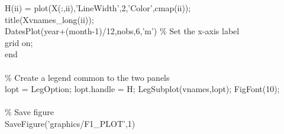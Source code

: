 \hspace{1mm}\hspace{5mm} \hspace{5mm} H(ii) = plot(X(:,ii),\textcolor{matlabpurple}{'LineWidth'},2,\textcolor{matlabpurple}{'Color'},cmap(ii)); \\ 
\hspace{1mm}\hspace{5mm} \hspace{5mm} title(Xvnames\_long(ii));  \\ 
\hspace{1mm}\hspace{5mm} \hspace{5mm} DatesPlot(year+(month-1)/12,nobs,6,\textcolor{matlabpurple}{'m'}) \textcolor{matlabgreen}{\% Set the x-axis label  }\\ 
\hspace{1mm}\hspace{5mm} \hspace{5mm} grid on;  \\ 
\hspace{1mm}\hspace{5mm} \textcolor{matlabblue}{end} \\ 
\hspace{1mm}\hspace{5mm}  \\ 
\hspace{1mm}\hspace{5mm} \textcolor{matlabgreen}{\% Create a legend common to the two panels }\\ 
\hspace{1mm}\hspace{5mm} lopt = LegOption; lopt.handle = H; LegSubplot(vnames,lopt); FigFont(10); \\ 
\hspace{1mm}\hspace{5mm}  \\ 
\hspace{1mm}\hspace{5mm} \textcolor{matlabgreen}{\% Save figure }\\ 
\hspace{1mm}\hspace{5mm} SaveFigure(\textcolor{matlabpurple}{'graphics/F1\_PLOT'},1) \\ 
\hspace{1mm}\hspace{5mm}  \\ 
\hspace{1mm}\hspace{5mm}  \\ 
